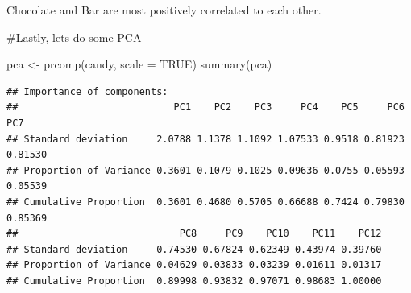 \documentclass[
]{article}
\newenvironment{Shaded}{\begin{snugshade}}{\end{snugshade}}
\newcommand{\AttributeTok}[1]{\textcolor[rgb]{0.77,0.63,0.00}{#1}}
\newcommand{\ConstantTok}[1]{\textcolor[rgb]{0.00,0.00,0.00}{#1}}
\newcommand{\FunctionTok}[1]{\textcolor[rgb]{0.00,0.00,0.00}{#1}}
\newcommand{\NormalTok}[1]{#1}
\newcommand{\OtherTok}[1]{\textcolor[rgb]{0.56,0.35,0.01}{#1}}
\begin{document}
Chocolate and Bar are most positively correlated to each other.

\#Lastly, lets do some PCA

\begin{Shaded}
\begin{Highlighting}[]
\NormalTok{pca }\OtherTok{\textless{}{-}} \FunctionTok{prcomp}\NormalTok{(candy, }\AttributeTok{scale =} \ConstantTok{TRUE}\NormalTok{)}
\FunctionTok{summary}\NormalTok{(pca)}
\end{Highlighting}
\end{Shaded}

\begin{verbatim}
## Importance of components:
##                           PC1    PC2    PC3     PC4    PC5     PC6     PC7
## Standard deviation     2.0788 1.1378 1.1092 1.07533 0.9518 0.81923 0.81530
## Proportion of Variance 0.3601 0.1079 0.1025 0.09636 0.0755 0.05593 0.05539
## Cumulative Proportion  0.3601 0.4680 0.5705 0.66688 0.7424 0.79830 0.85369
##                            PC8     PC9    PC10    PC11    PC12
## Standard deviation     0.74530 0.67824 0.62349 0.43974 0.39760
## Proportion of Variance 0.04629 0.03833 0.03239 0.01611 0.01317
## Cumulative Proportion  0.89998 0.93832 0.97071 0.98683 1.00000
\end{verbatim}
\end{document}

